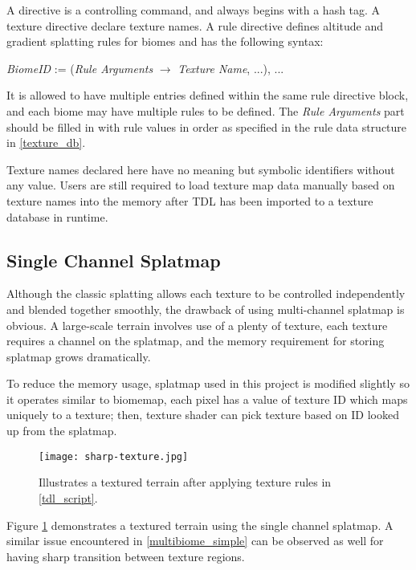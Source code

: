 \documentclass[oneside, a4paper]{report}
\begin{document}
    A directive is a controlling command, and always begins with a hash tag. A texture directive declare texture names. A rule directive defines altitude and gradient splatting rules for biomes and has the following syntax:

    \begin{center}
        \textit{BiomeID} := (\textit{Rule Arguments} \(\rightarrow\) \textit{Texture Name}, ...), ...
    \end{center}

    It is allowed to have multiple entries defined within the same rule directive block, and each biome may have multiple rules to be defined. The \textit{Rule Arguments} part should be filled in with rule values in order as specified in the rule data structure in \ref{texture_db}.

    Texture names declared here have no meaning but symbolic identifiers without any value. Users are still required to load texture map data manually based on texture names into the memory after TDL has been imported to a texture database in runtime.

    \subsection{Single Channel Splatmap}

    Although the classic splatting allows each texture to be controlled independently and blended together smoothly, the drawback of using multi-channel splatmap is obvious. A large-scale terrain involves use of a plenty of texture, each texture requires a channel on the splatmap, and the memory requirement for storing splatmap grows dramatically.

    To reduce the memory usage, splatmap used in this project is modified slightly so it operates similar to biomemap, each pixel has a value of texture ID which maps uniquely to a texture; then, texture shader can pick texture based on ID looked up from the splatmap.

    \begin{figure}[H]
        \texttt{[image: sharp-texture.jpg]}
        \caption{Illustrates a textured terrain after applying texture rules in \ref{tdl_script}.}
        \label{splatting_simple}
    \end{figure}

    Figure \ref{splatting_simple} demonstrates a textured terrain using the single channel splatmap. A similar issue encountered in \ref{multibiome_simple} can be observed as well for having sharp transition between texture regions.
    
\end{document}
